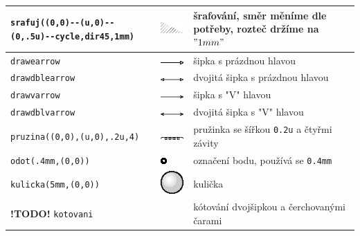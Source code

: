 \documentclass[a4paper,10pt]{article}
\begin{document}
\begin{tabularx}{\textwidth}{|l|l|X|}
    \verb+srafuj((0,0)--(u,0)--(0,.5u)--cycle,dir45,1mm)+ & 
      \raise-12pt\hbox{\includegraphics{mp_fks_7}}&
	šrafování, směr měníme dle potřeby, rozteč držíme na $"1 mm"$\\\hline 
    \verb+drawearrow+ & \includegraphics{mp_fks_8}&
	šipka s prázdnou hlavou\\\hline
    \verb+drawdblearrow+ & \includegraphics{mp_fks_9}&
	dvojitá šipka s prázdnou hlavou\\\hline
    \verb+drawvarrow+ & \includegraphics{mp_fks_10}&
	šipka s "V" hlavou\\\hline
    \verb+drawdblvarrow+ & \includegraphics{mp_fks_11}&
	dvojitá šipka s "V" hlavou\\\hline
    \verb+pruzina((0,0),(u,0),.2u,4)+ & \includegraphics{mp_fks_12}&
	pružinka se šířkou {\tt 0.2u} a čtyřmi závity\\\hline
    \verb+odot(.4mm,(0,0))+ & \includegraphics{mp_fks_13}&
	označení bodu, používá se {\tt 0.4mm}\\\hline
    \verb+kulicka(5mm,(0,0))+ & \includegraphics{mp_fks_14}&
	kulička\\\hline
    {\bf !TODO!} \verb+kotovani+ & & 
	kótování dvojšipkou a čerchovanými čarami\\\hline
\end{tabularx}\bigskip
\end{document}
